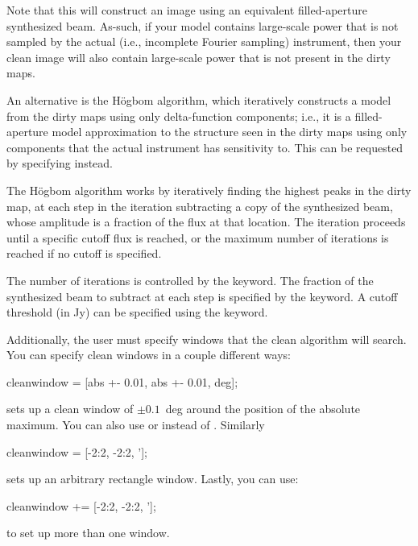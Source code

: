 Note that this will construct an image using an equivalent
filled-aperture synthesized beam.  As-such, if your model contains
large-scale power that is not sampled by the actual (i.e., incomplete
Fourier sampling) instrument, then your clean image will also contain
large-scale power that is not present in the dirty maps.  

An alternative is the H{\"o}gbom algorithm, which iteratively
  constructs a model from the dirty maps using only delta-function
  components; i.e., it is a filled-aperture model approximation to the
  structure seen in the dirty maps using only components that the
  actual instrument has sensitivity to.  This can be requested by
  specifying  instead.

The H{\"o}gbom algorithm works by iteratively finding the highest
peaks in the dirty map, at each step in the iteration subtracting a
copy of the synthesized beam, whose amplitude is a fraction of the
flux at that location.  The iteration proceeds until a specific cutoff
flux is reached, or the maximum number of iterations is reached if no
cutoff is specified.

The number of iterations is controlled by the 
keyword.  The fraction of the synthesized beam to subtract at each
step is specified by the  keyword.  A cutoff threshold
(in Jy) can be specified using the  keyword.  

Additionally, the user must specify windows that the clean algorithm
will search.  You can specify clean windows in a couple different ways:

\begin{myindentpar}{3cm}
cleanwindow = [abs +- 0.01, abs +- 0.01, deg];
\end{myindentpar}

sets up a clean window of $\pm 0.1$~deg around the position of the
absolute maximum.  You can also use  or  instead
of .  Similarly

\begin{myindentpar}{3cm}
cleanwindow = [-2:2, -2:2, '];
\end{myindentpar}

sets up an arbitrary rectangle window.  Lastly, you can use:

\begin{myindentpar}{3cm}
cleanwindow += [-2:2, -2:2, '];
\end{myindentpar}

to set up more than one window.

